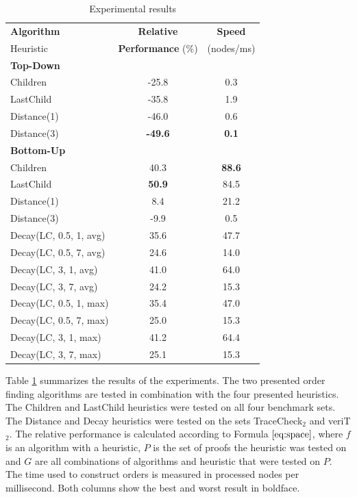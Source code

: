 \begin{table}[tb]
\centering
\setlength{\tabcolsep}{8pt}
\begin{tabular}{l c c}
\toprule
\textbf{Algorithm} & \textbf{Relative} & \textbf{Speed}\\ 
Heuristic & \textbf{Performance} (\%) & (nodes/ms)\\ 
\midrule
\textbf{Top-Down} & & \\
Children & -25.8 & 0.3 \\
LastChild & -35.8 & 1.9 \\
Distance(1) & -46.0 & 0.6 \\ 
Distance(3) & \textbf{-49.6} & \textbf{0.1}\\ \midrule

\textbf{Bottom-Up} & & \\
Children & 40.3 & \textbf{88.6} \\ 
LastChild & \textbf{50.9} & 84.5 \\ 

Distance(1) & 8.4 & 21.2 \\ 
Distance(3) & -9.9 & 0.5\\ 

Decay(LC, 0.5, 1, avg) & 35.6 & 47.7\\ 
Decay(LC, 0.5, 7, avg) & 24.6 & 14.0 \\
Decay(LC, 3,   1, avg) & 41.0 & 64.0\\
Decay(LC, 3,   7, avg) & 24.2 & 15.3 \\ 
Decay(LC, 0.5, 1, max) & 35.4 & 47.0 \\
Decay(LC, 0.5, 7, max) & 25.0 & 15.3 \\
Decay(LC, 3,   1, max) & 41.2 & 64.4 \\
Decay(LC, 3,   7, max) & 25.1 & 15.3 \\
\bottomrule
\end{tabular}
\caption{Experimental results}
\label{tab:results}
\end{table}

Table \ref{tab:results} summarizes the results of the experiments.
The two presented order finding algorithms are tested in combination with the four presented heuristics.
The Children and LastChild heuristics were tested on all four benchmark sets.
The Distance and Decay heuristics were tested on the sets TraceCheck$_2$ and veriT$_2$.
The relative performance is calculated according to Formula $\ref{eq:space}$, where $f$ is an algorithm with a heuristic, $P$ is the set of proofs the heuristic was tested on and $G$ are all combinations of algorithms and heuristic that were tested on $P$.
The time used to construct orders is measured in processed nodes per millisecond.
Both columns show the best and worst result in boldface.

